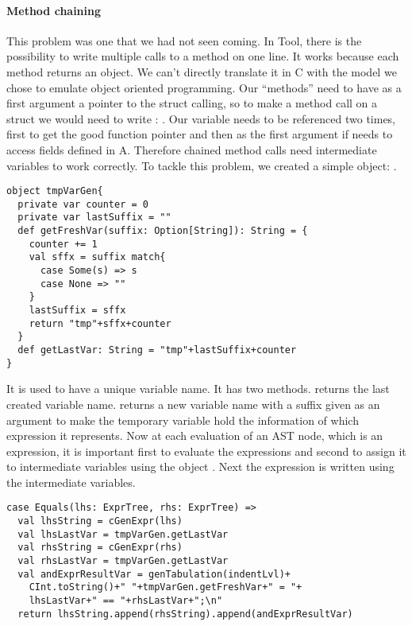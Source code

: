 \paragraph{Method chaining}
This problem was one that we had not seen coming.
\newline
In Tool, there is the possibility to write multiple calls to a method on one line.
It works because each method returns an object.
We can't directly translate it in C with the model we chose to emulate object oriented programming.
Our ``methods'' need to have as a first argument a pointer to the struct calling,
so to make a method call on a struct we would need to write : \lstset{style=customc}{\lstinline[basicstyle=\small\ttfamily]|void * a = new(nA); ((struct A *) a)->foo(a)|}.
Our variable \lstset{style=customc}{\lstinline[basicstyle=\small\ttfamily]|a|} needs to be referenced two times,
first to get the good function pointer and then as the first argument if \lstset{style=customc}{\lstinline[basicstyle=\small\ttfamily]|foo|}
needs to access fields defined in A.
Therefore chained method calls need intermediate variables to work correctly.
To tackle this problem, we created a simple object: .
\lstset{style=customscala}
\begin{lstlisting}
object tmpVarGen{
  private var counter = 0
  private var lastSuffix = ""
  def getFreshVar(suffix: Option[String]): String = {
    counter += 1
    val sffx = suffix match{
      case Some(s) => s
      case None => ""
    }
    lastSuffix = sffx
    return "tmp"+sffx+counter
  }
  def getLastVar: String = "tmp"+lastSuffix+counter
}
\end{lstlisting}
It is used to have a unique variable name. It has two methods.
 returns the last created variable name.
 returns a new variable name with a suffix given as an argument to make the temporary variable hold the information of which expression it represents.
\newline
Now at each evaluation of an AST node, which is an expression, it is important first to evaluate the expressions
and second to assign it to intermediate variables using the object . Next the expression is written using
the intermediate variables.
\begin{lstlisting}
case Equals(lhs: ExprTree, rhs: ExprTree) =>
  val lhsString = cGenExpr(lhs)
  val lhsLastVar = tmpVarGen.getLastVar
  val rhsString = cGenExpr(rhs)
  val rhsLastVar = tmpVarGen.getLastVar
  val andExprResultVar = genTabulation(indentLvl)+
    CInt.toString()+" "+tmpVarGen.getFreshVar+" = "+
    lhsLastVar+" == "+rhsLastVar+";\n"
  return lhsString.append(rhsString).append(andExprResultVar)
\end{lstlisting}
